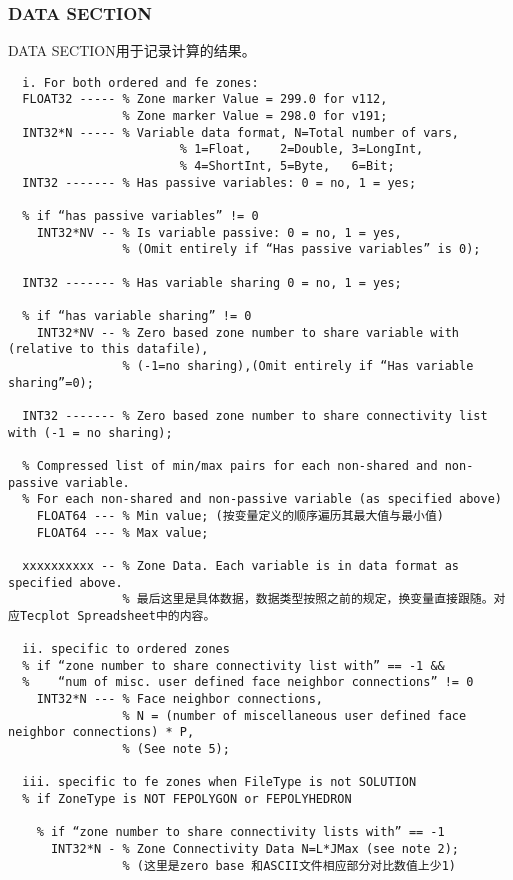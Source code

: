 \documentclass[lang=cn,11pt,a4paper]{elegantpaper}
\begin{document}
\subsubsection{DATA SECTION}\label{datasection}
DATA SECTION用于记录计算的结果。

\begin{lstlisting}
  i. For both ordered and fe zones:
  FLOAT32 ----- % Zone marker Value = 299.0 for v112,
                % Zone marker Value = 298.0 for v191;
  INT32*N ----- % Variable data format, N=Total number of vars,
                        % 1=Float,    2=Double, 3=LongInt,
                        % 4=ShortInt, 5=Byte,   6=Bit;
  INT32 ------- % Has passive variables: 0 = no, 1 = yes;

  % if “has passive variables” != 0
    INT32*NV -- % Is variable passive: 0 = no, 1 = yes,
                % (Omit entirely if “Has passive variables” is 0);

  INT32 ------- % Has variable sharing 0 = no, 1 = yes;

  % if “has variable sharing” != 0
    INT32*NV -- % Zero based zone number to share variable with (relative to this datafile),
                % (-1=no sharing),(Omit entirely if “Has variable sharing”=0);

  INT32 ------- % Zero based zone number to share connectivity list with (-1 = no sharing);
  
  % Compressed list of min/max pairs for each non-shared and non-passive variable. 
  % For each non-shared and non-passive variable (as specified above)
    FLOAT64 --- % Min value; (按变量定义的顺序遍历其最大值与最小值)
    FLOAT64 --- % Max value;

  xxxxxxxxxx -- % Zone Data. Each variable is in data format as specified above.
                % 最后这里是具体数据，数据类型按照之前的规定，换变量直接跟随。对应Tecplot Spreadsheet中的内容。

  ii. specific to ordered zones
  % if “zone number to share connectivity list with” == -1 &&
  %    “num of misc. user defined face neighbor connections” != 0
    INT32*N --- % Face neighbor connections,
                % N = (number of miscellaneous user defined face neighbor connections) * P,
                % (See note 5);

  iii. specific to fe zones when FileType is not SOLUTION
  % if ZoneType is NOT FEPOLYGON or FEPOLYHEDRON

    % if “zone number to share connectivity lists with” == -1
      INT32*N - % Zone Connectivity Data N=L*JMax (see note 2);
                % (这里是zero base 和ASCII文件相应部分对比数值上少1)


\end{lstlisting}
\end{document}
